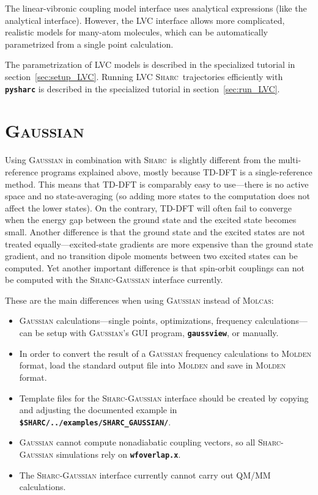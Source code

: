 \documentclass[a4paper,11pt,DIV=15,openany]{scrbook}
\makeatletter
\newcommand{\refermanual}[2][rectangle,draw=B,thick,fill=black!5,inner sep=1pt,outer sep=0pt,rounded corners]{\marginpar{\tikz[baseline=(current bounding box.north)]\node at (0,0) [#1]{\begin{tabular}{@{}l@{}}See\\ section\\ \ref*{#2}\\ (p. \pageref*{#2})\\ in the\\ manual.\end{tabular}};}}
\newcommand{\sharc}{\textsc{Sharc}}
\newcommand{\ttt}[1]{\textbf{\texttt{#1}}}
\makeatother
\begin{document}
The linear-vibronic coupling model interface uses analytical expressions (like the analytical interface).
However, the LVC interface allows more complicated, realistic models for many-atom molecules, which can be automatically parametrized from a single point calculation.

The parametrization of LVC models is described in the specialized tutorial in section~\ref{sec:setup_LVC}.
Running LVC \sharc\ trajectories efficiently with \ttt{pysharc} is described in the specialized tutorial in section~\ref{sec:run_LVC}.


\section{\textsc{Gaussian}}
\refermanual{m-sec:int:gaussian}

Using \textsc{Gaussian} in combination with \sharc\ is slightly different from the multi-reference programs explained above, mostly because TD-DFT is a single-reference method.
This means that TD-DFT is comparably easy to use---there is no active space and no state-averaging (so adding more states to the computation does not affect the lower states).
On the contrary, TD-DFT will often fail to converge when the energy gap between the ground state and the excited state becomes small.
Another difference is that the ground state and the excited states are not treated equally---excited-state gradients are more expensive than the ground state gradient, and no transition dipole moments between two excited states can be computed.
Yet another important difference is that spin-orbit couplings can not be computed with the \sharc-\textsc{Gaussian} interface currently.

These are the main differences when using \textsc{Gaussian} instead of \textsc{Molcas}:
\begin{itemize}
  \item \textsc{Gaussian} calculations---single points, optimizations, frequency calculations---can be setup with \textsc{Gaussian}'s GUI program, \ttt{gaussview}, or manually.
  \item In order to convert the result of a \textsc{Gaussian} frequency calculations to \textsc{Molden} format, load the standard output file into \textsc{Molden} and save in \textsc{Molden} format.
  \item Template files for the \sharc-\textsc{Gaussian} interface should be created by copying and adjusting the documented example in \ttt{\$SHARC/../examples/SHARC\_GAUSSIAN/}.
  \item \textsc{Gaussian} cannot compute nonadiabatic coupling vectors, so all \sharc-\textsc{Gaussian} simulations rely on \ttt{wfoverlap.x}.
  \item The \sharc-\textsc{Gaussian} interface currently cannot carry out QM/MM calculations.
\end{itemize}
\end{document}
